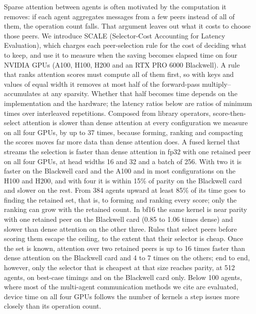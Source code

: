 Sparse attention between agents is often motivated by the computation it
removes: if each agent aggregates messages from a few peers instead of all of
them, the operation count falls. That argument leaves out what it costs to
choose those peers. We introduce SCALE (Selector-Cost Accounting for Latency
Evaluation), which charges each peer-selection rule for the cost of deciding
what to keep, and use it to measure when the saving becomes elapsed time on four
NVIDIA GPUs (A100, H100, H200 and an RTX PRO 6000 Blackwell). A rule that ranks
attention scores must compute all of them first, so with keys and values of
equal width it removes at most half of the forward-pass multiply--accumulates
at any sparsity. Whether that half becomes time depends on the implementation
and the hardware; the latency ratios below are ratios of minimum times over
interleaved repetitions. Composed from library operators, score-then-select attention
is slower than dense attention at every configuration we measure on all four
GPUs, by up to 37 times, because forming, ranking and compacting the scores
moves far more data than dense attention does. A fused kernel that streams the
selection is faster than dense attention in fp32 with one retained peer on all
four GPUs, at head widths 16 and 32 and a batch of 256. With two it is faster on the Blackwell card and the
A100 and in most configurations on the H100 and H200, and with four it is within 15\% of parity on the
Blackwell card and slower on the rest. From 384 agents upward at least 85\% of
its time goes to finding the retained set, that is, to forming and ranking every
score; only the ranking can grow with the retained count. In bf16 the same kernel is near parity with one retained peer on the
Blackwell card (0.85 to 1.06 times dense) and slower than dense attention on the
other three. Rules that select peers before scoring them escape the ceiling, to
the extent that their selector is cheap. Once the set is known, attention over
two retained peers is up to 16 times faster than dense attention on the
Blackwell card and 4 to 7 times on the others; end to end, however, only the
selector that is cheapest at that size reaches parity, at 512 agents, on best-case timings
and on the Blackwell card only. Below 100 agents, where most of the multi-agent communication methods we cite
are evaluated, device time on all four GPUs follows the number of kernels a
step issues more closely than its operation count.
